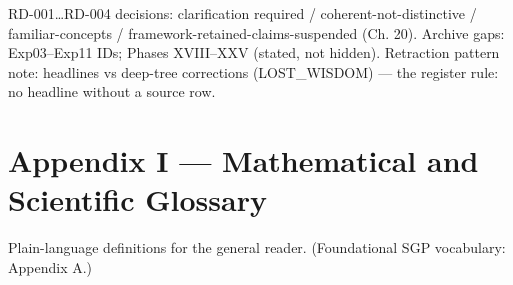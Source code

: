 \documentclass[
  11pt,
]{book}
\begin{document}
RD-001\ldots RD-004 decisions: clarification required /
coherent-not-distinctive / familiar-concepts /
framework-retained-claims-suspended (Ch. 20). Archive gaps: Exp03--Exp11
IDs; Phases XVIII--XXV (stated, not hidden). Retraction pattern note:
headlines vs deep-tree corrections (LOST\_WISDOM) --- the register rule:
no headline without a source row.

\newpage

\chapter{Appendix I --- Mathematical and Scientific
Glossary}\label{appendix-i-mathematical-and-scientific-glossary}

Plain-language definitions for the general reader. (Foundational SGP
vocabulary: Appendix A.)
\end{document}
